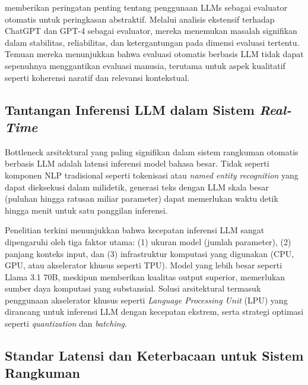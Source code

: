 \textcite{shen2023} memberikan peringatan penting tentang penggunaan LLMs sebagai evaluator otomatis untuk peringkasan abstraktif. Melalui analisis ekstensif terhadap ChatGPT dan GPT-4 sebagai evaluator, mereka menemukan masalah signifikan dalam stabilitas, reliabilitas, dan ketergantungan pada dimensi evaluasi tertentu. Temuan mereka menunjukkan bahwa evaluasi otomatis berbasis LLM tidak dapat sepenuhnya menggantikan evaluasi manusia, terutama untuk aspek kualitatif seperti koherensi naratif dan relevansi kontekstual.

\subsection{Tantangan Inferensi LLM dalam Sistem \textit{Real-Time}}

Bottleneck arsitektural yang paling signifikan dalam sistem rangkuman otomatis berbasis LLM adalah latensi inferensi model bahasa besar. Tidak seperti komponen NLP tradisional seperti tokenisasi atau \textit{named entity recognition} yang dapat dieksekusi dalam milidetik, generasi teks dengan LLM skala besar (puluhan hingga ratusan miliar parameter) dapat memerlukan waktu detik hingga menit untuk satu panggilan inferensi.

Penelitian terkini menunjukkan bahwa kecepatan inferensi LLM sangat dipengaruhi oleh tiga faktor utama: (1) ukuran model (jumlah parameter), (2) panjang konteks input, dan (3) infrastruktur komputasi yang digunakan (CPU, GPU, atau akselerator khusus seperti TPU). Model yang lebih besar seperti Llama 3.1 70B, meskipun memberikan kualitas output superior, memerlukan sumber daya komputasi yang substansial. Solusi arsitektural termasuk penggunaan akselerator khusus seperti \textit{Language Processing Unit} (LPU) yang dirancang untuk inferensi LLM dengan kecepatan ekstrem, serta strategi optimasi seperti \textit{quantization} dan \textit{batching}.

\subsection{Standar Latensi dan Keterbacaan untuk Sistem Rangkuman}


